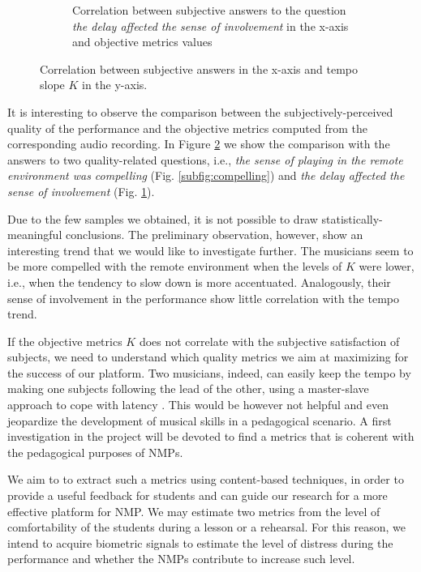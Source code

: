 \begin{figure}[t]
\begin{subfigure}[t]{.43\columnwidth}
		\caption{Correlation between subjective answers to the question \textit{the delay affected the sense of involvement} in the x-axis and objective metrics values}
		\label{subfig:involvement}
	\end{subfigure}
	\quad 
	\caption{Correlation between subjective answers in the x-axis and tempo slope $K$ in the y-axis.}\label{fig:ci}
\end{figure}  

It is interesting to observe the comparison between the subjectively-perceived quality of the performance and the  objective metrics computed from the corresponding audio recording. In Figure \ref{fig:ci} we show the comparison with the answers to two quality-related questions, i.e., \textit{the sense of playing in the remote environment was compelling} (Fig. \ref{subfig:compelling}) and \textit{the delay affected the sense of involvement} (Fig. \ref{subfig:involvement}).

Due to the few samples we obtained, it is not possible to draw statistically-meaningful conclusions. The preliminary observation, however, show an interesting trend that we would like to investigate further. The musicians seem to be more compelled with the remote environment when the levels of $K$ were lower, i.e., when the tendency to slow down is more accentuated. Analogously, their sense of involvement in the performance show little correlation with the tempo trend. 

If the objective metrics $K$ does not correlate with the subjective satisfaction of subjects, we need to understand which quality metrics we aim at maximizing for the success of our platform. Two musicians, indeed, can easily keep the tempo by making one subjects following the lead of the other, using a master-slave approach to cope with latency \cite{Carot07networkmusic}. This would be however not helpful and even jeopardize the development of musical skills in a pedagogical scenario. A first investigation in the project will be devoted to find a metrics that is coherent with the pedagogical purposes of NMPs.  

We aim to to extract such a metrics using content-based techniques, in order to provide a useful feedback for students and can guide our research for a more effective platform for NMP. We may estimate two metrics from the level of comfortability of the students during a lesson or a rehearsal. For this reason, we intend to acquire biometric signals to estimate the level of distress during the performance and whether the NMPs contribute to increase such level. 



